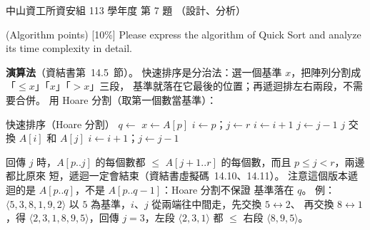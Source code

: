 \begin{pastexam}[label={px:nsysu-113-dmalg-07}]{中山資工所資安組 113 學年度 第 7 題}
（設計、分析）

(Algorithm points) {[10\%]} Please express the algorithm of Quick Sort and analyze its time complexity in
detail.
\end{pastexam}

\begin{pastsoln}
\textbf{演算法}（資結書第~14.5~節）。 快速排序是分治法：選一個基準 $x$，把陣列分割成「$\le x$」「$x$」「$> x$」三段，
基準就落在它最後的位置；再遞迴排左右兩段，不需要合併。 用 Hoare 分割（取第一個數當基準）：
\begin{pseudo}{快速排序（Hoare 分割）}
        \State $q \gets$ 
        \State {}
        \State {}
    \EndIf
\EndProcedure
{}
    \State $x \gets A[p]$ 
    \State $i \gets p$；$j \gets r$
    \While{\TRUE}
            \State $i \gets i + 1$
        \EndWhile
            \State $j \gets j - 1$
        \EndWhile
            \State \Return $j$
        \EndIf
        \State 交換 $A[i]$ 和 $A[j]$
        \State $i \gets i + 1$；$j \gets j - 1$
    \EndWhile
\EndFunction
\end{pseudo}
 回傳 $j$ 時，$A[p..j]$ 的每個數都 $\le$ $A[j+1..r]$ 的每個數，而且 $p \le j < r$，兩邊都比原來
短，遞迴一定會結束（資結書虛擬碼~14.10、14.11）。 注意這個版本遞迴的是 $A[p..q]$，不是 $A[p..q-1]$：Hoare 分割不保證
基準落在 $q$。 例：$\langle 5, 3, 8, 1, 9, 2\rangle$ 以 $5$ 為基準，$i$、$j$ 從兩端往中間走，先交換 $5 \leftrightarrow 2$、
再交換 $8 \leftrightarrow 1$，得 $\langle 2, 3, 1, 8, 9, 5\rangle$，回傳 $j = 3$，左段 $\langle 2, 3, 1\rangle$ 都 $\le$ 右段
$\langle 8, 9, 5\rangle$。


\end{pastsoln}
